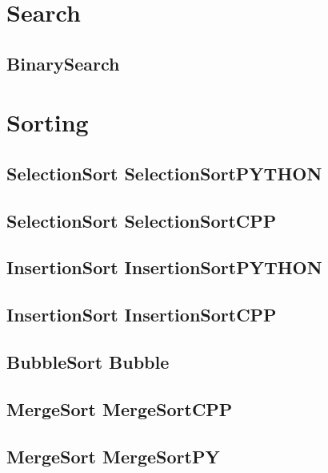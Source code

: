 \section{Search}
\subsection{ BinarySearch}
\raggedbottom
\hrulefill

\section{Sorting}
\subsection{SelectionSort SelectionSortPYTHON}
\raggedbottom
\hrulefill
\subsection{SelectionSort SelectionSortCPP}
\raggedbottom
\hrulefill
\subsection{InsertionSort InsertionSortPYTHON}
\raggedbottom
\hrulefill
\subsection{InsertionSort InsertionSortCPP}
\raggedbottom
\hrulefill
\subsection{BubbleSort Bubble}
\raggedbottom
\hrulefill
\subsection{MergeSort MergeSortCPP}
\raggedbottom
\hrulefill
\subsection{MergeSort MergeSortPY}
\raggedbottom
\hrulefill
